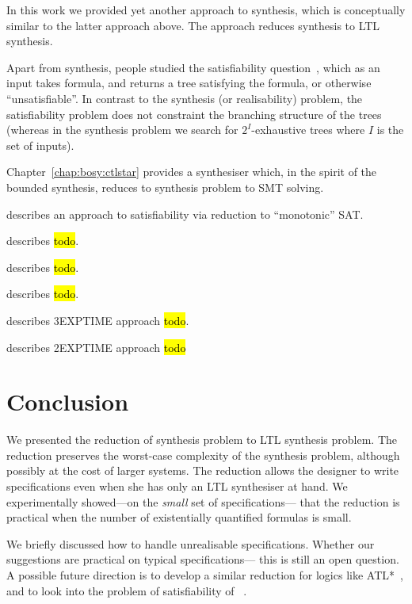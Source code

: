 In this work we provided yet another approach to \CTLstar synthesis,
which is conceptually similar to the latter approach above.
The approach reduces \CTLstar synthesis to LTL synthesis.

Apart from \CTLstar synthesis, people studied the \CTLstar satisfiability question~\cite{WHO?},
which as an input takes \CTLstar formula,
and returns a tree satisfying the formula, or otherwise ``unsatisfiable''.
In contrast to the synthesis (or realisability) problem,
the satisfiability problem does not constraint the branching structure of the trees
(whereas in the synthesis problem we search for $2^I$-exhaustive trees 
 where $I$ is the set of inputs).

Chapter~\ref{chap:bosy:ctlstar} provides a \CTLstar synthesiser which, in the spirit of the bounded synthesis,
reduces to synthesis problem to SMT solving.



\cite{klenze2016fast} describes an approach to \CTL satisfiability via reduction to ``monotonic'' SAT.

\cite{de2012synthesizing} describes \hl{todo}.

\cite{ctlsat} describes \hl{todo}.

\cite{FLL10} describes \hl{todo}.

\cite{ES84} describes 3EXPTIME approach \hl{todo}.

\cite{EJ99} describes 2EXPTIME approach \hl{todo}

\fi


\section{Conclusion}\label{sec:conclusion}
We presented the reduction of \CTLstar synthesis problem to LTL synthesis problem.
The reduction preserves the worst-case complexity of the synthesis problem,
although possibly at the cost of larger systems.
The reduction allows the designer to write \CTLstar specifications
even when she has only an LTL synthesiser at hand.
We experimentally showed---on the \emph{small} set of specifications---%
that the reduction is practical when the number of existentially quantified formulas is small.

We briefly discussed how to handle unrealisable \CTLstar specifications.
Whether our suggestions are practical on typical specifications---%
this is still an open question.
A possible future direction is to develop a similar reduction for logics like ATL*~\cite{Alur97},
and to look into the problem of satisfiability of \CTLstar~\cite{ES84}.

